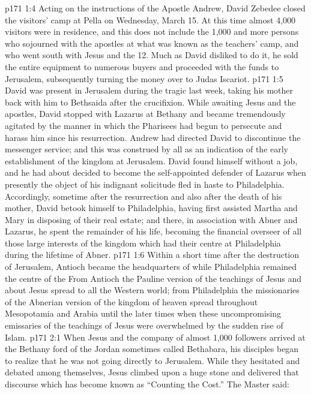 \vs p171 1:4 Acting on the instructions of the Apostle Andrew, David Zebedee closed the visitors’ camp at Pella on Wednesday, March 15. At this time almost 4,000 visitors were in residence, and this does not include the 1,000 and more persons who sojourned with the apostles at what was known as the teachers’ camp, and who went south with Jesus and the 12. Much as David disliked to do it, he sold the entire equipment to numerous buyers and proceeded with the funds to Jerusalem, subsequently turning the money over to Judas Iscariot.
\vs p171 1:5 \pc David was present in Jerusalem during the tragic last week, taking his mother back with him to Bethsaida after the crucifixion. While awaiting Jesus and the apostles, David stopped with Lazarus at Bethany and became tremendously agitated by the manner in which the Pharisees had begun to persecute and harass him since his resurrection. Andrew had directed David to discontinue the messenger service; and this was construed by all as an indication of the early establishment of the kingdom at Jerusalem. David found himself without a job, and he had about decided to become the self\hyp{}appointed defender of Lazarus when presently the object of his indignant solicitude fled in haste to Philadelphia. Accordingly, sometime after the resurrection and also after the death of his mother, David betook himself to Philadelphia, having first assisted Martha and Mary in disposing of their real estate; and there, in association with Abner and Lazarus, he spent the remainder of his life, becoming the financial overseer of all those large interests of the kingdom which had their centre at Philadelphia during the lifetime of Abner.
\vs p171 1:6 Within a short time after the destruction of Jerusalem, Antioch became the headquarters of  while Philadelphia remained the centre of the  From Antioch the Pauline version of the teachings of Jesus and about Jesus spread to all the Western world; from Philadelphia the missionaries of the Abnerian version of the kingdom of heaven spread throughout Mesopotamia and Arabia until the later times when these uncompromising emissaries of the teachings of Jesus were overwhelmed by the sudden rise of Islam.
\vs p171 2:1 When Jesus and the company of almost 1,000 followers arrived at the Bethany ford of the Jordan sometimes called Bethabara, his disciples began to realize that he was not going directly to Jerusalem. While they hesitated and debated among themselves, Jesus climbed upon a huge stone and delivered that discourse which has become known as “Counting the Cost.” The Master said:
